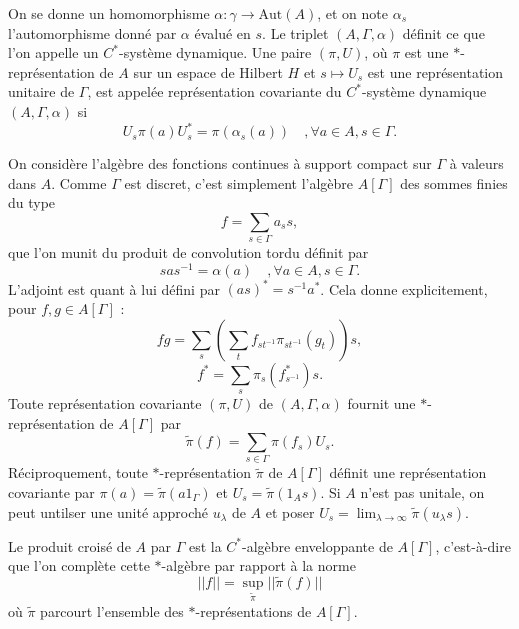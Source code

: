 On se donne un homomorphisme $\alpha : \gamma \rightarrow \text{Aut}(A)$, et on note $\alpha_s$ l'automorphisme donné par $\alpha$ évalué en $s$. Le triplet $(A,\Gamma, \alpha)$ définit ce que l'on appelle un $C^*$-système dynamique. Une paire $(\pi, U)$, où $\pi $ est une $*$-représentation de $A$ sur un espace de Hilbert $H$ et $s\mapsto U_s$ est une représentation unitaire de $\Gamma$, est appelée représentation covariante du $C^*$-système dynamique $(A,\Gamma,\alpha)$ si 
\[U_s \pi(a) U_s^* = \pi(\alpha_s(a))\quad,\forall a\in A, s\in \Gamma.\]

On considère l'algèbre des fonctions continues à support compact sur $\Gamma$ à valeurs dans $A$. Comme $\Gamma$ est discret, c'est simplement l'algèbre $A[\Gamma]$ des sommes finies du type 
\[f=\sum_ {s\in \Gamma} a_s s,\]
que l'on munit du produit de convolution tordu définit par 
\[s a s^{-1} = \alpha(a) \quad,\forall a\in A, s\in \Gamma.\]
L'adjoint est quant à lui défini par $(as)^*=s^{-1} a^*$. Cela donne explicitement, pour $f,g\in A[\Gamma]$ :
\[fg= \sum_s \left(\sum_t f_{st^{-1}}\pi_{st^{-1}}(g_t)\right)s,\]
\[f^*= \sum_s \pi_s(f^*_{s^{-1}})s.\] 
Toute représentation covariante $(\pi,U)$ de $(A,\Gamma,\alpha)$ fournit une $*$-représentation de $A[\Gamma]$ par 
\[\tilde\pi (f)=\sum_{s\in\Gamma} \pi(f_s)U_s.\]
Réciproquement, toute $*$-représentation $\tilde \pi$ de $A[\Gamma]$ définit une représentation covariante par $\pi(a)=\tilde\pi(a1_\Gamma)$ et $U_s=\tilde\pi(1_A s)$. Si $A$ n'est pas unitale, on peut untilser une unité approché $u_\lambda$ de $A$ et poser $U_s=\lim_{\lambda \rightarrow \infty}\tilde\pi (u_\lambda s)$.\\

\begin{definition} Le produit croisé de $A$ par $\Gamma$ est la $C^*$-algèbre enveloppante de $A[\Gamma]$, c'est-à-dire que l'on complète cette $*$-algèbre par rapport à la norme 
\[||f|| = \sup_{\tilde\pi} ||\tilde \pi (f)||\]
où $\tilde \pi$ parcourt l'ensemble des $*$-représentations de $A[\Gamma]$. 
\end{definition}

